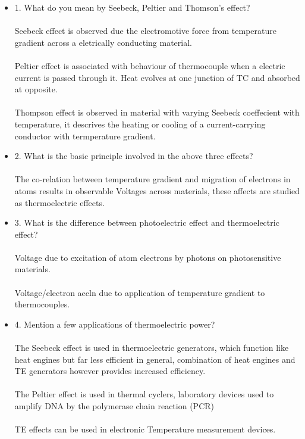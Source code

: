 \documentclass{article}
\begin{document}
\begin{itemize}
    \item 1. What do you mean by Seebeck, Peltier and Thomson’s effect?
    \\
    \\
    Seebeck effect is observed due the electromotive force from temperature gradient across a eletrically conducting material.
    \\
    \\
    Peltier effect is associated with behaviour of thermocouple when a electric current is passed through it. Heat evolves at one junction of TC and absorbed at opposite.
    \\
    \\
    Thompson effect is observed in material with varying Seebeck coeffecient with temperature, it descrives the heating or cooling of a current-carrying conductor with termperature gradient.
    \\
    \item 2. What is the basic principle involved in the above three effects?
    \\
    \\
    The co-relation between temperature gradient and migration of electrons in atoms results in observable Voltages across materials, these affects are studied as thermoelectric effects.
    \item 3. What is the difference between photoelectric effect and thermoelectric effect?
    \\
    \\
    Voltage due to excitation of atom electrons by photons on photosensitive materials.
    \\
    \\
    Voltage/electron accln due to application of temperature gradient to thermocouples.
    \item 4. Mention a few applications of thermoelectric power?
    \\
    \\
    The Seebeck effect is used in thermoelectric generators, which function like heat engines but far less efficient in general, combination of heat engines and TE generators however provides increased efficiency. 
    \\
    \\
    The Peltier effect is used in thermal cyclers, laboratory devices used to amplify DNA by the polymerase chain reaction (PCR)
    \\
    \\
    TE effects can be used in electronic Temperature measurement devices.
\end{itemize}
\end{document}

